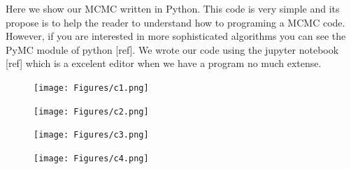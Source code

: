 \documentclass[onecolumn,           %
               showpacs,            %
               preprintnumbers,     %
               aps,                 %
               letterpaper,             %
               superscriptaddress,      %
               nofootinbib,         %
               tightenlines,        %
               floats,floatfix      %
               ,usenatbib,
               ]{revtex4-1}
\begin{document}
Here we show our MCMC written in Python. This code is very simple and its propose is to help the reader to understand how to programing a MCMC code. However, if you are interested in more sophisticated algorithms you can see the PyMC module of python [ref]. We wrote our code using the jupyter notebook [ref] which is a excelent editor when we have a program no much extense.  

\begin{figure}[h!]
\texttt{[image: Figures/c1.png]}
\end{figure}
\begin{figure}[h!]
\texttt{[image: Figures/c2.png]}
\end{figure}
\begin{figure}[h!]
\texttt{[image: Figures/c3.png]}
\end{figure}
\begin{figure}[h!]
\texttt{[image: Figures/c4.png]}
\end{figure}
\end{document}
